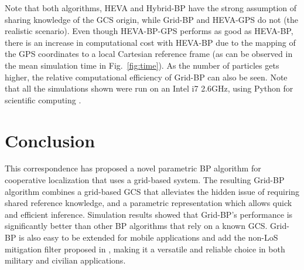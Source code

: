 \documentclass[10pt, final, journal]{IEEEtran}
\begin{document}
Note that both algorithms, HEVA and Hybrid-BP have the strong assumption of sharing knowledge of the GCS origin, while Grid-BP and HEVA-GPS do not (the realistic scenario). Even though HEVA-BP-GPS performs as good as HEVA-BP, there is an increase in computational cost with HEVA-BP due to the mapping of the GPS coordinates to a local Cartesian reference frame (as can be observed in the mean simulation time in Fig.~\ref{fig:time}). As the number of particles gets higher, the relative computational efficiency of Grid-BP can also be seen. Note that all the simulations shown were run on an Intel i7 2.6GHz, using Python for scientific computing \cite{Oliphant:2007dm}.
\section{Conclusion}
This correspondence has proposed a novel parametric BP algorithm for cooperative localization that uses a grid-based system. The resulting Grid-BP algorithm combines a grid-based GCS that alleviates the hidden issue of requiring shared reference knowledge, and a parametric representation which allows quick and efficient inference. Simulation results showed that Grid-BP's performance is significantly better than other BP algorithms that rely on a known GCS. Grid-BP is also easy to be extended for mobile applications and add the non-LoS mitigation filter proposed in \cite{oikonomou2011hybrid}, making it a versatile and reliable choice in both military and civilian applications.
\end{document}
